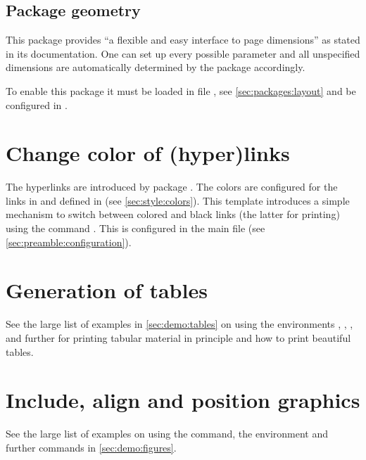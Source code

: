 \subsection{Package geometry}
This package provides \enquote{a flexible and easy interface to page dimensions} as stated in its documentation. One can set up every possible parameter and all unspecified dimensions are automatically determined by the package accordingly.

To enable this package it must be loaded in file , see \cref{sec:packages:layout} and be configured in .

\section{Change color of (hyper)links}
\label{sec:doc:faq:hyperlinks}
The hyperlinks are introduced by package . The colors are configured for the links in  and defined in  (see \cref{sec:style:colors}). This template introduces a simple mechanism to switch between colored and black links (the latter for printing) using the command . This is configured in the main file (see \cref{sec:preamble:configuration}).

\section{Generation of tables}
\label{sec:doc:faq:tables}
See the large list of examples in \cref{sec:demo:tables} on using the environments , , ,  and further for printing tabular material in principle and how to print beautiful tables.

\section{Include, align and position graphics}
\label{sec:doc:faq:graphics}
See the large list of examples on using the  command, the  environment and further commands in \cref{sec:demo:figures}.

